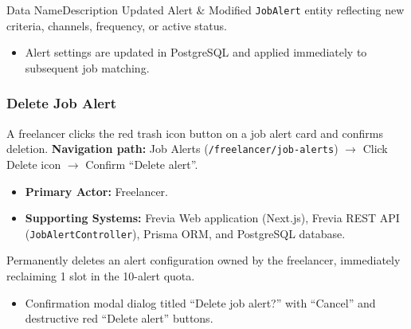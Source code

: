 \begin{specdatatable}{Data Name}{Description}
Updated Alert & Modified \texttt{JobAlert} entity reflecting new criteria, channels, frequency, or active status.\\ \hline
\end{specdatatable}

\begin{itemize}[leftmargin=1.6em,topsep=3pt,itemsep=2pt,parsep=0pt,label=$\bullet$]
    \item Alert settings are updated in PostgreSQL and applied immediately to subsequent job matching.
\end{itemize}

\subsubsection{Delete Job Alert}

A freelancer clicks the red trash icon button on a job alert card and confirms deletion.\newline
\textbf{Navigation path:} Job Alerts (\texttt{/freelancer/job-alerts}) $\rightarrow$ Click Delete icon $\rightarrow$ Confirm ``Delete alert''.


\begin{itemize}[leftmargin=1.6em,topsep=3pt,itemsep=2pt,parsep=0pt,label=$\bullet$]
    \item \textbf{Primary Actor:} Freelancer.
    \item \textbf{Supporting Systems:} Frevia Web application (Next.js), Frevia REST API (\texttt{JobAlertController}), Prisma ORM, and PostgreSQL database.
\end{itemize}

\noindent Permanently deletes an alert configuration owned by the freelancer, immediately reclaiming 1 slot in the 10-alert quota.

\begin{itemize}[leftmargin=1.6em,topsep=3pt,itemsep=2pt,parsep=0pt,label=$\bullet$]
    \item Confirmation modal dialog titled ``Delete job alert?'' with ``Cancel'' and destructive red ``Delete alert'' buttons.
\end{itemize}

